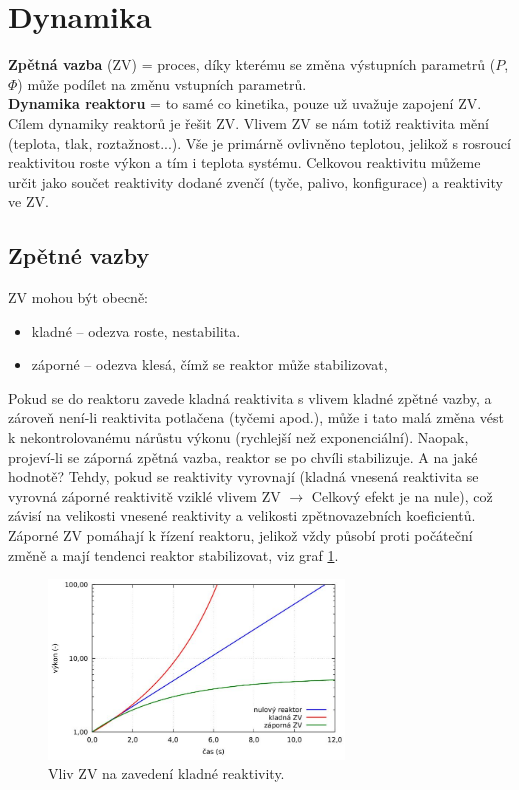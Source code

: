 \section{Dynamika}

\textbf{Zpětná vazba} (ZV) = proces, díky kterému se změna výstupních parametrů ($P$, $\Phi$) může podílet na změnu vstupních parametrů.\\

\textbf{Dynamika reaktoru} = to samé co kinetika, pouze už uvažuje zapojení ZV.\\

Cílem dynamiky reaktorů je řešit ZV. Vlivem ZV se nám totiž reaktivita mění (teplota, tlak, roztažnost...). Vše je primárně ovlivněno teplotou, jelikož s rosroucí reaktivitou roste výkon a tím i teplota systému. Celkovou reaktivitu můžeme určit jako součet reaktivity dodané zvenčí (tyče, palivo, konfigurace) a reaktivity ve ZV.\\

\subsection{Zpětné vazby}

ZV mohou být obecně:

\begin{itemize}
  \item kladné -- odezva roste, nestabilita.
  \item záporné -- odezva klesá, čímž se reaktor může stabilizovat,
\end{itemize}

Pokud se do reaktoru zavede kladná reaktivita s vlivem kladné zpětné vazby, a zároveň není-li reaktivita potlačena (tyčemi apod.), může i tato malá změna vést k nekontrolovanému nárůstu výkonu (rychlejší než exponenciální). Naopak, projeví-li se záporná zpětná vazba, reaktor se po chvíli stabilizuje. A na jaké hodnotě? Tehdy, pokud se reaktivity vyrovnají (kladná vnesená reaktivita se vyrovná záporné reaktivitě vziklé vlivem ZV $\rightarrow$ Celkový efekt je na nule), což závisí na velikosti vnesené reaktivity a velikosti zpětnovazebních koeficientů. Záporné ZV pomáhají k řízení reaktoru, jelikož vždy působí proti počáteční změně a mají tendenci reaktor stabilizovat, viz graf \ref{ZV}.

\begin{figure}[H]
  \centering
  \includegraphics[width=0.7\textwidth]{img/ZV.JPG}
  \caption{Vliv ZV na zavedení kladné reaktivity.}
  \label{ZV}
\end{figure}

